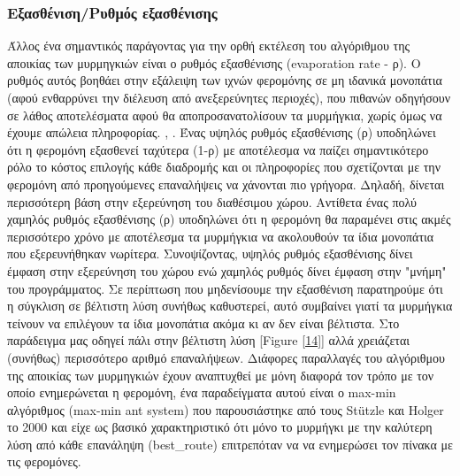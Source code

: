 \subsubsection{Εξασθένιση/Ρυθμός εξασθένισης}
Άλλος ένα σημαντικός παράγοντας για την ορθή εκτέλεση του αλγόριθμου της αποικίας των μυρμηγκιών είναι ο ρυθμός εξασθένισης (evaporation rate - ρ). Ο ρυθμός αυτός βοηθάει στην εξάλειψη των ιχνών φερομόνης σε μη ιδανικά μονοπάτια (αφού ενθαρρύνει την διέλευση από ανεξερεύνητες περιοχές), που πιθανών οδηγήσουν σε λάθος αποτελέσματα αφού θα αποπροσανατολίσουν τα μυρμήγκια, χωρίς όμως να έχουμε απώλεια πληροφορίας. \cite{mavrovouniotis2014ant}, \cite{mpikou2013euretikoi}. Ένας υψηλός ρυθμός εξασθένισης (ρ) υποδηλώνει ότι η φερομόνη εξασθενεί ταχύτερα (1-ρ) με αποτέλεσμα να παίζει σημαντικότερο ρόλο το κόστος επιλογής κάθε διαδρομής και οι πληροφορίες που σχετίζονται με την φερομόνη από προηγούμενες επαναλήψεις να χάνονται πιο γρήγορα. Δηλαδή, δίνεται περισσότερη βάση στην εξερεύνηση του διαθέσιμου χώρου. Αντίθετα ένας πολύ χαμηλός ρυθμός εξασθένισης (ρ) υποδηλώνει ότι η φερομόνη θα παραμένει στις ακμές περισσότερο χρόνο με αποτέλεσμα τα μυρμήγκια να ακολουθούν τα ίδια μονοπάτια που εξερευνήθηκαν νωρίτερα.
Συνοψίζοντας, υψηλός ρυθμός εξασθένισης δίνει έμφαση στην εξερεύνηση του χώρου ενώ χαμηλός ρυθμός δίνει έμφαση στην "μνήμη" του προγράμματος. Σε περίπτωση που μηδενίσουμε την εξασθένιση παρατηρούμε ότι η σύγκλιση σε βέλτιστη λύση συνήθως καθυστερεί, αυτό συμβαίνει γιατί τα μυρμήγκια τείνουν να επιλέγουν τα ίδια μονοπάτια ακόμα κι αν δεν είναι βέλτιστα. Στο παράδειγμα μας οδηγεί πάλι στην βέλτιστη λύση [Figure \ref{14}] αλλά χρειάζεται (συνήθως) περισσότερο αριθμό επαναλήψεων. \cite{mpikou2013euretikoi} Διάφορες παραλλαγές του αλγόριθμου της αποικίας των μυρμηγκιών έχουν αναπτυχθεί με μόνη διαφορά τον τρόπο με τον οποίο ενημερώνεται η φερομόνη, ένα παραδείγματα αυτού είναι ο max-min αλγόριθμος (max-min ant system) που παρουσιάστηκε από τους Stützle και Holger το 2000 και είχε ως βασικό χαρακτηριστικό ότι μόνο το μυρμήγκι με την καλύτερη λύση από κάθε επανάληψη (best\_route) επιτρεπόταν να να ενημερώσει τον πίνακα με τις φερομόνες. \cite{stutzle2000max}


